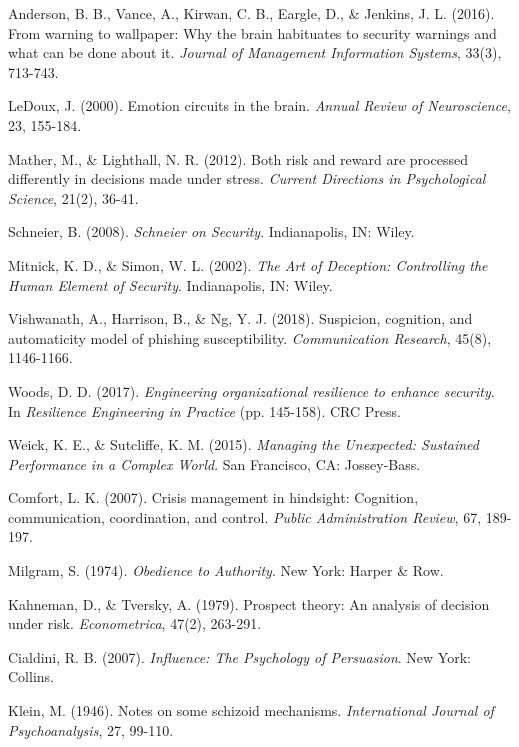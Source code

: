 \documentclass[11pt,a4paper]{article}
\begin{document}
\begin{thebibliography}{99}
 Anderson, B. B., Vance, A., Kirwan, C. B., Eargle, D., \& Jenkins, J. L. (2016). From warning to wallpaper: Why the brain habituates to security warnings and what can be done about it. \textit{Journal of Management Information Systems}, 33(3), 713-743.

 LeDoux, J. (2000). Emotion circuits in the brain. \textit{Annual Review of Neuroscience}, 23, 155-184.

 Mather, M., \& Lighthall, N. R. (2012). Both risk and reward are processed differently in decisions made under stress. \textit{Current Directions in Psychological Science}, 21(2), 36-41.

 Schneier, B. (2008). \textit{Schneier on Security}. Indianapolis, IN: Wiley.

 Mitnick, K. D., \& Simon, W. L. (2002). \textit{The Art of Deception: Controlling the Human Element of Security}. Indianapolis, IN: Wiley.

 Vishwanath, A., Harrison, B., \& Ng, Y. J. (2018). Suspicion, cognition, and automaticity model of phishing susceptibility. \textit{Communication Research}, 45(8), 1146-1166.

 Woods, D. D. (2017). \textit{Engineering organizational resilience to enhance security}. In \textit{Resilience Engineering in Practice} (pp. 145-158). CRC Press.

 Weick, K. E., \& Sutcliffe, K. M. (2015). \textit{Managing the Unexpected: Sustained Performance in a Complex World}. San Francisco, CA: Jossey-Bass.

 Comfort, L. K. (2007). Crisis management in hindsight: Cognition, communication, coordination, and control. \textit{Public Administration Review}, 67, 189-197.

 Milgram, S. (1974). \textit{Obedience to Authority}. New York: Harper \& Row.

 Kahneman, D., \& Tversky, A. (1979). Prospect theory: An analysis of decision under risk. \textit{Econometrica}, 47(2), 263-291.

 Cialdini, R. B. (2007). \textit{Influence: The Psychology of Persuasion}. New York: Collins.

 Klein, M. (1946). Notes on some schizoid mechanisms. \textit{International Journal of Psychoanalysis}, 27, 99-110.


\end{thebibliography}
\end{document}
